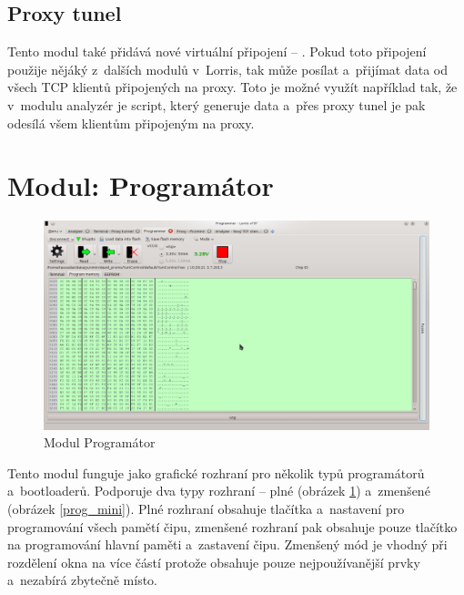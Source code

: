 \documentclass[12pt, a4paper, oneside]{article}
\begin{document}
\subsection{Proxy tunel}
Tento modul také přidává nové virtuální připojení -- . Pokud toto připojení použije nějáký z~dalších modulů v~Lorris, tak může posílat a~přijímat data od všech TCP klientů připojených na proxy. Toto je možné využít například tak, že v~modulu analyzér je script, který generuje data a~přes proxy tunel je pak odesílá všem klientům připojeným na proxy.

\newpage
\setlength{\voffset}{0mm} %
\pagestyle{plain}

\section{Modul: Programátor}
\begin{figure}[H]
\begin{center}
\includegraphics[width=\textwidth]{img/programmer.png}
\caption{Modul Programátor}
\label{prog_full}
\end{center}
\end{figure}

Tento modul funguje jako grafické rozhraní pro několik typů programátorů a~bootloaderů. Podporuje dva typy rozhraní -- plné (obrázek \ref{prog_full}) a~zmenšené (obrázek \ref{prog_mini}). Plné rozhraní obsahuje tlačítka a~nastavení pro programování všech pamětí čipu, zmenšené rozhraní pak obsahuje pouze tlačítko na programování hlavní paměti a~zastavení čipu. Zmenšený mód je vhodný při rozdělení okna na více částí protože obsahuje pouze nejpoužívanější prvky a~nezabírá zbytečně místo.
\end{document}

